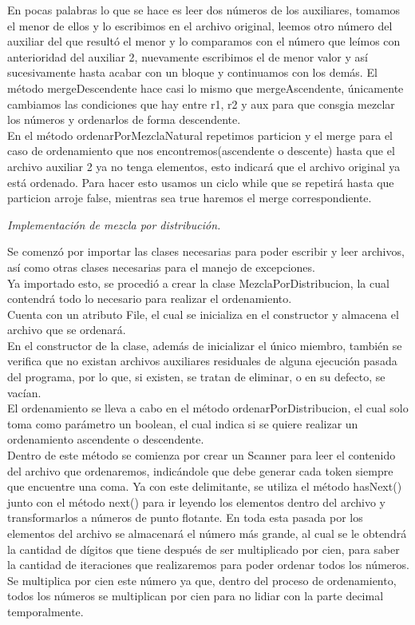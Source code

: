 \documentclass[12pt,letterpaper]{article}
\begin{document}
\begin{large}
En pocas palabras lo que se hace es leer dos números de los auxiliares, tomamos el menor de ellos y lo escribimos en el archivo
original, leemos otro número del auxiliar del que resultó el menor y lo comparamos con el número que leímos con anterioridad del auxiliar 2, nuevamente escribimos el de menor valor y así sucesivamente hasta acabar con un bloque y continuamos con los demás.
El método mergeDescendente hace casi lo mismo que mergeAscendente, únicamente cambiamos las condiciones que hay entre r1, r2 y aux para que consgia mezclar los números y ordenarlos de forma descendente.\\
En el método ordenarPorMezclaNatural repetimos particion y el merge para el caso de ordenamiento que nos encontremos(ascendente o descente) hasta que el archivo auxiliar 2 ya no tenga elementos, esto indicará que el archivo original ya está ordenado. Para hacer esto usamos un ciclo while que se repetirá hasta que particion arroje false, mientras sea true haremos el merge correspondiente.\par
\vspace{0.2cm}
\newpage
\noindent\textit{Implementación de mezcla por distribución.}\par
Se comenzó por importar las clases necesarias para poder escribir y leer archivos, así como otras clases necesarias para el manejo de excepciones.\\
Ya importado esto, se procedió a crear la clase MezclaPorDistribucion, la cual contendrá todo lo necesario para realizar el ordenamiento.\\
Cuenta con un atributo File, el cual se inicializa en el constructor y almacena el archivo que se ordenará.\\
En el constructor de la clase, además de inicializar el único miembro, también se verifica que no existan archivos auxiliares residuales de alguna ejecución pasada del programa, por lo que, si existen, se tratan de eliminar, o en su defecto, se vacían. \\
El ordenamiento se lleva a cabo en el método ordenarPorDistribucion, el cual solo toma como parámetro un boolean, el cual indica si se quiere realizar un ordenamiento ascendente o descendente. \\
Dentro de este método se comienza por crear un Scanner para leer el contenido del archivo que ordenaremos, indicándole que debe generar cada token siempre que encuentre una coma. Ya con este delimitante, se utiliza el método hasNext() junto con el método next() para ir leyendo los elementos dentro del archivo y transformarlos a números de punto flotante. En toda esta pasada por los elementos del archivo se almacenará el número más grande, al cual se le obtendrá la cantidad de dígitos que tiene después de ser multiplicado por cien, para saber la cantidad de iteraciones que realizaremos para poder ordenar todos los números. Se multiplica por cien este número ya que, dentro del proceso de ordenamiento, todos los números se multiplican por cien para no lidiar con la parte decimal temporalmente.\\

\end{large}
\end{document}
